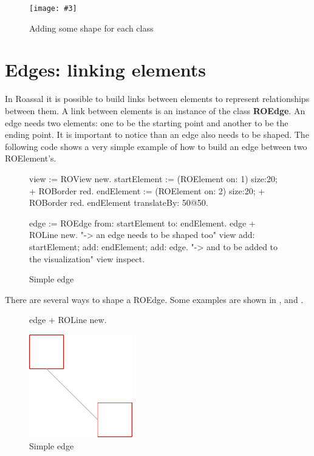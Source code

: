 \documentclass[a4paper,10pt,twoside]{book}
\newcommand{\fig}[4]{
		\begin{figure}[#1]
			\centering
			\texttt{[image: \#3]}
			\caption{\label{fig:#3}#4}
		\end{figure}}
\begin{document}
\fig{H}{0.6}{hier2}{Adding some shape for each class}


\section{Edges: linking elements} 

In Roassal it is possible to build links between elements to represent relationships between them. A link between elements is an instance of the class \textbf{ROEdge}. An edge needs two elements: one to be the starting point and another to be the ending point. It is important to notice than an edge also needs to be shaped. The following code shows a very simple example of how to build an edge between two ROElement's.


\begin{figure}[H]
 \begin{code}{}
view := ROView new.
startElement := (ROElement on: 1) size:20; + ROBorder red.
endElement := (ROElement on: 2)  size:20; + ROBorder red.
endElement translateBy: 50@50.

edge := ROEdge from: startElement to: endElement.
edge + ROLine new. "-> an edge needs to be shaped too"
view 
	add: startElement; 
	add: endElement; 
	add: edge. "-> and to be added to the visualization"
view inspect.
\end{code}   
\caption{Simple edge}
\label{fig:simpleEdge}
\end{figure} 

There are several ways to shape a ROEdge. Some examples are shown in ,  and .

\begin{figure}[H]
      \begin{minipage}[t]{0.5\textwidth}
      \vspace{0pt}
     \begin{code}{}
edge + ROLine new. \end{code}
   \end{minipage}
   \hfill
   \begin{minipage}[t]{0.4\textwidth}
      \vspace{0pt} \raggedright
       \centering
		\includegraphics[width=0.4\textwidth]{line}
   \end{minipage}
\caption{Simple edge}
\label{fig:line}
\end{figure} 
\end{document}
